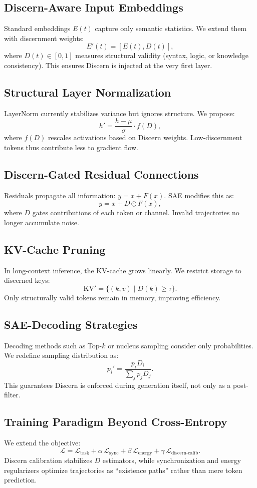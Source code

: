 \documentclass[11pt]{article}
\theoremstyle{plain}
\theoremstyle{definition}
\theoremstyle{remark}
\begin{document}
\subsection{Discern-Aware Input Embeddings}
Standard embeddings $E(t)$ capture only semantic statistics.  
We extend them with discernment weights:
\[
  E'(t) = [E(t), D(t)],
\]
where $D(t)\in[0,1]$ measures structural validity (syntax, logic, or knowledge consistency).
This ensures Discern is injected at the very first layer.

\subsection{Structural Layer Normalization}
LayerNorm currently stabilizes variance but ignores structure.
We propose:
\[
  h' = \frac{h - \mu}{\sigma} \cdot f(D),
\]
where $f(D)$ rescales activations based on Discern weights.
Low-discernment tokens thus contribute less to gradient flow.

\subsection{Discern-Gated Residual Connections}
Residuals propagate all information: $y = x + F(x)$.  
SAE modifies this as:
\[
  y = x + D \odot F(x),
\]
where $D$ gates contributions of each token or channel.
Invalid trajectories no longer accumulate noise.

\subsection{KV-Cache Pruning}
In long-context inference, the KV-cache grows linearly.
We restrict storage to discerned keys:
\[
  \text{KV}' = \{(k,v) \mid D(k) \geq \tau \}.
\]
Only structurally valid tokens remain in memory, improving efficiency.

\subsection{SAE-Decoding Strategies}
Decoding methods such as Top-$k$ or nucleus sampling consider only probabilities.
We redefine sampling distribution as:
\[
  p_i' = \frac{p_i D_i}{\sum_j p_j D_j}.
\]
This guarantees Discern is enforced during generation itself,
not only as a post-filter.

\subsection{Training Paradigm Beyond Cross-Entropy}
We extend the objective:
\[
  \mathcal{L} = \mathcal{L}_{\text{task}}
  + \alpha\,\mathcal{L}_{\text{sync}}
  + \beta\,\mathcal{L}_{\text{energy}}
  + \gamma\,\mathcal{L}_{\text{discern-calib}}.
\]
Discern calibration stabilizes $D$ estimators, while
synchronization and energy regularizers optimize trajectories as
``existence paths'' rather than mere token prediction.
\end{document}
